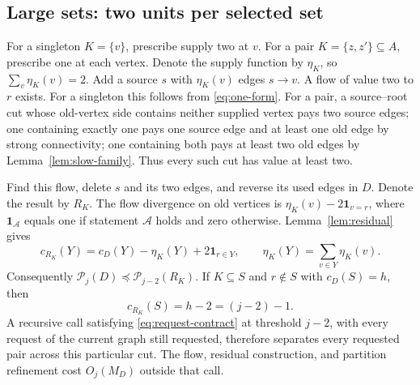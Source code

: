 \documentclass[11pt]{article}
\theoremstyle{definition}
\theoremstyle{remark}
\newcommand{\PP}{\mathcal P}
\newcommand{\one}{\mathbf 1}
\begin{document}
\subsection{Large sets: two units per selected set}
For a singleton \(K=\{v\}\), prescribe supply two at \(v\). For a pair \(K=\{z,z'\}\subseteq A\), prescribe one at each vertex. Denote the supply function by \(\eta_K\), so \(\sum_v\eta_K(v)=2\). Add a source \(s\) with \(\eta_K(v)\) edges \(s\to v\). A flow of value two to \(r\) exists. For a singleton this follows from \eqref{eq:one-form}. For a pair, a source--root cut whose old-vertex side contains neither supplied vertex pays two source edges; one containing exactly one pays one source edge and at least one old edge by strong connectivity; one containing both pays at least two old edges by Lemma~\ref{lem:slow-family}. Thus every such cut has value at least two.

Find this flow, delete \(s\) and its two edges, and reverse its used edges in \(D\). Denote the result by \(R_K\). The flow divergence on old vertices is
\(\eta_K(v)-2\one_{v=r}\), where \(\one_{\mathcal A}\) equals one if statement \(\mathcal A\) holds and zero otherwise. Lemma~\ref{lem:residual} gives
\begin{equation}
 c_{R_K}(Y)=c_D(Y)-\eta_K(Y)+2\one_{r\in Y},
 \qquad \eta_K(Y)=\sum_{v\in Y}\eta_K(v).
 \label{eq:two-residual}
\end{equation}
Consequently \(\PP_j(D)\preceq\PP_{j-2}(R_K)\). If \(K\subseteq S\) and \(r\notin S\) with \(c_D(S)=h\), then
\begin{equation}
 c_{R_K}(S)=h-2=(j-2)-1.
 \label{eq:two-witness}
\end{equation}
A recursive call satisfying \eqref{eq:request-contract} at threshold \(j-2\), with every request of the current graph still requested, therefore separates every requested pair across this particular cut. The flow, residual construction, and partition refinement cost \(O_j(M_D)\) outside that call.
\end{document}
